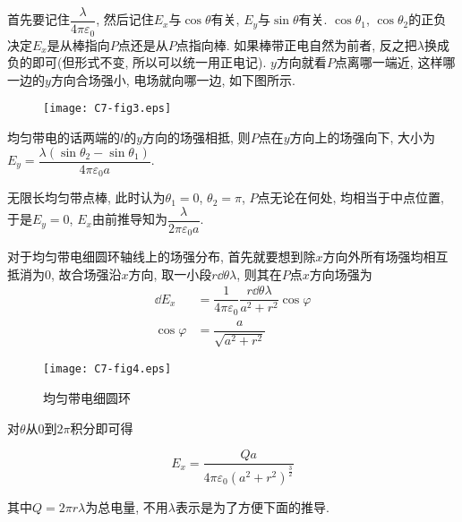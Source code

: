 \begin{note}
	
	\indent 首先要记住$\dfrac{\lambda}{4\pi \varepsilon_0}$, 然后记住$E_x$与$\cos \theta$有关, $E_y$与$\sin \theta$有关. $\cos \theta_1$, $\cos \theta_2$的正负决定$E_x$是从棒指向$P$点还是从$P$点指向棒. 如果棒带正电自然为前者, 反之把$\lambda$换成负的即可(但形式不变, 所以可以统一用正电记). $y$方向就看$P$点离哪一端近, 这样哪一边的$y$方向合场强小, 电场就向哪一边, 如下图所示. 
	
	\begin{figure}[h]
		\centering
		\texttt{[image: C7-fig3.eps]}
		\label{C7-fig3}
	\end{figure}
	
	均匀带电的话两端的$l$的$y$方向的场强相抵, 则$P$点在$y$方向上的场强向下, 大小为$E_y = \dfrac{\lambda (\sin \theta_2 - \sin \theta_1)}{4 \pi \varepsilon_0 a}$. 
	
\end{note}

\vskip 0.3cm

\begin{example}
	无限长均匀带点棒, 此时认为$\theta_1=0$, $\theta_2=\pi$, $P$点无论在何处, 均相当于中点位置, 于是$E_y=0$, $E_x$由前推导知为$\dfrac{\lambda}{2 \pi \varepsilon_0 a}$. 
\end{example}

\vskip 0.3cm

\begin{example}
	对于均匀带电细圆环轴线上的场强分布, 首先就要想到除$x$方向外所有场强均相互抵消为0, 故合场强沿$x$方向, 取一小段$r\dd{\theta}\lambda$, 则其在$P$点$x$方向场强为
	\begin{align*}
		\dd{E_x} &= \dfrac{1}{4\pi\varepsilon_0} \dfrac{r\dd{\theta}\lambda}{a^2+r^2}\cos\varphi \\
		\cos \varphi &= \dfrac{a}{\sqrt{a^2+r^2}}
	\end{align*}
    
    \begin{figure}[h]
    	\centering
    	\texttt{[image: C7-fig4.eps]}
    	\caption{均匀带电细圆环}
    \end{figure}
    
    对$\theta$从0到$2\pi$积分即可得
	
	\begin{equation*}
		E_x=\dfrac{Qa}{4\pi\varepsilon_0{(a^2+r^2)}^{{\frac{3}{2}}}}
	\end{equation*}
    
    其中$Q=2\pi r\lambda$为总电量, 不用$\lambda$表示是为了方便下面的推导. 
	
\end{example}


